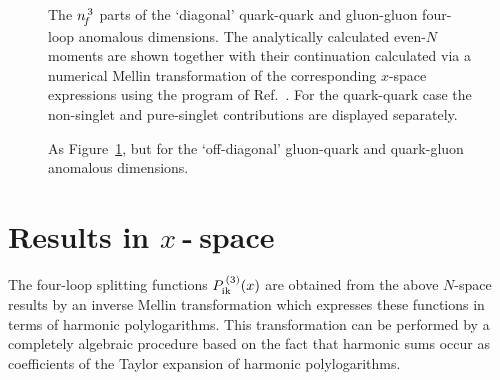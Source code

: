 \documentclass[12pt]{article}
\begin{document}
\begin{figure}[p]
\vspace{-4mm}
\centerline{}
\vspace{-2mm}
\caption{ \label{fig:gdiagnf3} \small
 The ${n^{\,3}_{\! f}}$ parts of the `diagonal' quark-quark and gluon-gluon four-loop 
 anomalous dimensions. The analytically calculated even-$N$ moments are
 shown together with their continuation calculated via a numerical Mellin 
 transformation of the corresponding $x$-space expressions using the
 program of Ref.~\cite{HPLnum}. 
 For the quark-quark case the non-singlet and pure-singlet contributions 
 are displayed separately.}
\vspace{-1mm}
\end{figure}
%
\begin{figure}[p]
\vspace{-2mm}
\centerline{}
\vspace{-2mm}
\caption{ \label{fig:goffdnf3} \small
 As Figure~\ref{fig:gdiagnf3}, but for the `off-diagonal' gluon-quark 
 and quark-gluon anomalous dimensions.}
\vspace{-1mm}
\end{figure}

\newpage

%
\setcounter{equation}{0}
\section{ Results in $x\:\!$-$\:\!$space}
\label{sec:xres}

The four-loop splitting functions $P_{\rm ik}^{\,(3)}(x)$ are obtained 
from the above $N$-space results by an inverse Mellin transformation which 
expresses these functions in terms of harmonic polylogarithms.
This transformation can be performed by a completely algebraic procedure 
\cite{Hpols,MV99} based on the fact that harmonic sums 
occur as coefficients of the Taylor expansion of harmonic polylogarithms.
\end{document}
